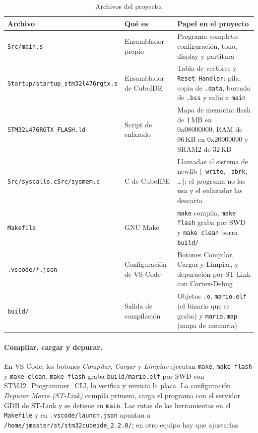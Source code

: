 \documentclass[11pt,letterpaper]{article}
\begin{document}
\begin{table}[H]
  \centering\small
  \caption{Archivos del proyecto.}
  \label{tab:archivos}
  \begin{tabularx}{\textwidth}{@{}P{4.4cm} P{2.9cm} L@{}}
    \toprule
    Archivo & Qué es & Papel en el proyecto \\
    \midrule
    \texttt{Src/main.s} & Ensamblador propio & Programa completo: configuración, tono, display y partitura \\
    \texttt{Startup/}\newline\texttt{startup\_stm32l476rgtx.s} & Ensamblador de CubeIDE &
      Tabla de vectores y \texttt{Reset\_Handler}: pila, copia de \texttt{.data}, borrado de \texttt{.bss} y salto a \texttt{main} \\
    \texttt{STM32L476RGTX\_FLASH.ld} & Script de enlazado &
      Mapa de memoria: flash de 1\,MB en 0x08000000, RAM de 96\,KB en 0x20000000 y SRAM2 de 32\,KB \\
    \texttt{Src/syscalls.c}\newline\texttt{Src/sysmem.c} & C de CubeIDE &
      Llamadas al sistema de newlib (\texttt{\_write}, \texttt{\_sbrk}, \dots); el programa no las usa y el enlazador las descarta \\
    \texttt{Makefile} & GNU Make &
      \texttt{make} compila, \texttt{make flash} graba por SWD y \texttt{make clean} borra \texttt{build/} \\
    \texttt{.vscode/*.json} & Configuración de VS Code &
      Botones Compilar, Cargar y Limpiar, y depuración por ST-Link con Cortex-Debug \\
    \texttt{build/} & Salida de compilación &
      Objetos \texttt{.o}, \texttt{mario.elf} (el binario que se graba) y \texttt{mario.map} (mapa de memoria) \\
    \bottomrule
  \end{tabularx}
\end{table}

\paragraph{Compilar, cargar y depurar.} En VS Code, los botones \emph{Compilar}, \emph{Cargar} y
\emph{Limpiar} ejecutan \texttt{make}, \texttt{make flash} y \texttt{make clean}. \texttt{make flash} graba
\texttt{build/mario.elf} por SWD con STM32\_\allowbreak Programmer\_\allowbreak CLI, lo verifica y reinicia la placa. La configuración
\emph{Depurar Mario (ST-Link)} compila primero, carga el programa con el servidor GDB de ST-Link y se detiene
en \texttt{main}. Las rutas de las herramientas en el \texttt{Makefile} y en \texttt{.vscode/launch.json}
apuntan a \nolinkurl{/home/jmaster/st/stm32cubeide_2.2.0/}; en otro equipo hay que ajustarlas.
\end{document}
